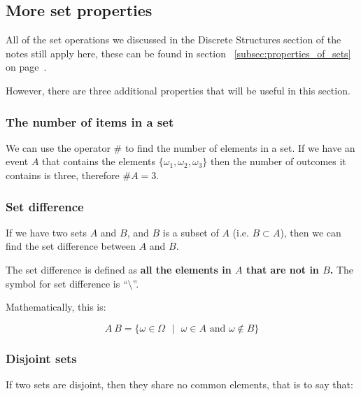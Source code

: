 
\subsection{More set properties}

All of the set operations we discussed in the Discrete Structures section of the
notes still apply here, these can be found in section
~\ref{subsec:properties_of_sets} on page~\pageref{subsec:properties_of_sets}.

However, there are three additional properties that will be useful in this
section.

\subsubsection{The number of items in a set}

We can use the operator $\#$ to find the number of elements in a set. If we have
an event $A$ that contains the elements $\{\omega_1, \omega_2, \omega_3\}$ then
the number of outcomes it contains is three, therefore $\#A = 3$.

\subsubsection{Set difference}

If we have two sets $A$ and $B$, and $B$ is a subset of $A$ (i.e. $B \subset
A$), then we can find the set difference between $A$ and $B$.

The set difference is defined as {\bf all the elements in $A$ that are not in
$B$.} The symbol for set difference is ``$\setminus$''.

Mathematically, this is:

\begin{dmath*}
	{A \ B = \{\omega \in \Omega \textrm{ } \vert \textrm{ } \omega \in A \textrm{ and } \omega \not\in B\}}
\end{dmath*}

\subsubsection{Disjoint sets}

If two sets are disjoint, then they share no common elements, that is to say
that:

